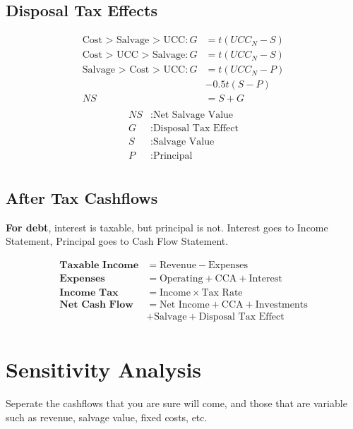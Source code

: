 \documentclass[landscape, letterpaper, 10pt]{article}
\begin{document}
\begin{multicols}{3}
    \subsection*{Disposal Tax Effects}
    \begin{align*}
        \text{Cost > Salvage > UCC}: G & = t(UCC_N - S) \\
        \text{Cost > UCC > Salvage}: G & = t(UCC_N - S) \\
        \text{Salvage > Cost > UCC}: G & = t(UCC_N - P) \\
                                       & - 0.5t(S-P)    \\
        NS                             & = S + G        \\
    \end{align*}
    \begin{align*}
        NS & : \text{Net Salvage Value}   \\
        G  & : \text{Disposal Tax Effect} \\
        S  & : \text{Salvage Value}       \\
        P  & : \text{Principal}           \\
    \end{align*}
    \subsection*{After Tax Cashflows}

    \textbf{For debt}, interest is taxable, but principal is not. Interest goes to Income Statement, Principal goes to Cash Flow Statement.

    \begin{align*}
        \textbf{Taxable Income} & = \text{Revenue} - \text{Expenses}                   \\
        \textbf{Expenses}       & =  \text{Operating} + \text{CCA} + \text{Interest}   \\
        \textbf{Income Tax}     & = \text{Income} \times \text{Tax Rate}               \\
        \textbf{Net Cash Flow}  & = \text{Net Income} + \text{CCA} +\text{Investments} \\
                                & +\text{Salvage} +\text{Disposal Tax Effect}          \\
    \end{align*}

    \section*{Sensitivity Analysis}
    Seperate the cashflows that you are sure will come, and those that are variable such as revenue, salvage value, fixed costs, etc.

\end{multicols}
\end{document}
